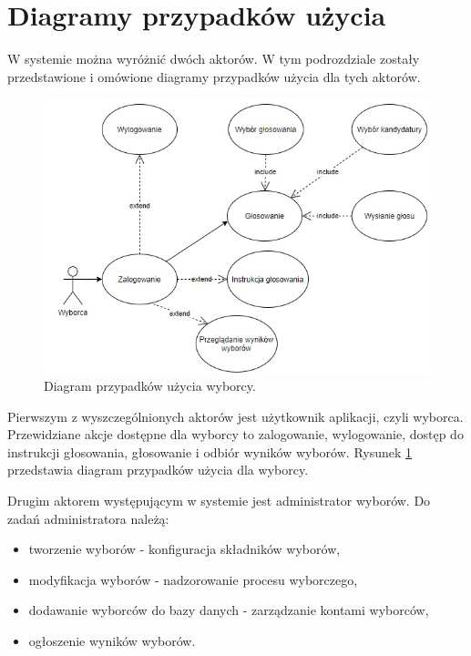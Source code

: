 \documentclass[a4paper,12pt]{book}
\begin{document}
\section{Diagramy przypadków użycia}

W systemie można wyróżnić dwóch aktorów. W tym podrozdziale zostały przedstawione i omówione diagramy przypadków użycia dla tych aktorów.

\begin{figure}[h]
	\centering
	\includegraphics[width=\textwidth]{images/user_use_case.jpg}
	\caption{Diagram przypadków użycia wyborcy.}\label{user-use}
\end {figure}

Pierwszym z wyszczególnionych aktorów jest użytkownik aplikacji, czyli wyborca. Przewidziane akcje dostępne dla wyborcy to zalogowanie, wylogowanie, dostęp do instrukcji głosowania, głosowanie i odbiór wyników wyborów. Rysunek \ref{user-use} przedstawia diagram przypadków użycia dla wyborcy.

Drugim aktorem występującym w systemie jest administrator wyborów. Do zadań administratora należą: 

\begin{itemize}
	\item tworzenie wyborów - konfiguracja składników wyborów,
	\item modyfikacja wyborów - nadzorowanie procesu wyborczego,
	\item dodawanie wyborców do bazy danych - zarządzanie kontami wyborców,
	\item ogłoszenie wyników wyborów.
\end{itemize}
\end{document}
